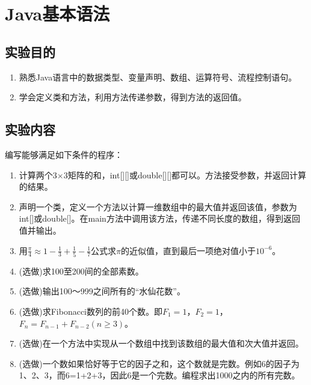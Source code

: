 ﻿\documentclass[cs5size,b5paper,nofonts,twoside]{ctexart}
\begin{document}




\clearpage
\section{Java基本语法}
\subsection{实验目的}
\begin{enumerate}
\item 熟悉Java语言中的数据类型、变量声明、数组、运算符号、流程控制语句。
\item 学会定义类和方法，利用方法传递参数，得到方法的返回值。
\end{enumerate}
\subsection{实验内容}
编写能够满足如下条件的程序：
\begin{enumerate}
\item 计算两个3$\times$3矩阵的和，int[][]或double[][]都可以。方法接受参数，并返回计算的结果。
\item 声明一个类，定义一个方法以计算一维数组中的最大值并返回该值，参数为int[]或double[]。在main方法中调用该方法，传递不同长度的数组，得到返回值并输出。
\item 用$\frac{\pi}{4}\approx 1-\frac{1}{3}+\frac{1}{5}-\frac{1}{7}$公式求$\pi$的近似值，直到最后一项绝对值小于$10^{-6}$。
\item (选做)求100至200间的全部素数。
\item (选做)输出100～999之间所有的“水仙花数”。
\item (选做)求Fibonacci数列的前40个数。即$F_1=1$，$F_2=1$，$F_n=F_{n-1}+F_{n-2} (n\ge 3)$。
\item (选做)在一个方法中实现从一个数组中找到该数组的最大值和次大值并返回。
\item (选做)一个数如果恰好等于它的因子之和，这个数就是完数。例如6的因子为1、2、3，而6=1+2+3，因此6是一个完数。编程求出1000之内的所有完数。
\end{enumerate}
\end{document}
